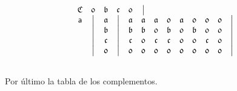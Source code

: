 \documentclass[final,12pt,a4paper,twoside,fleqn]{extbook}
\theoremstyle{definition}
\theoremstyle{remark}
\begin{document}
\begin{equation}
\begin{array}{@{}*{22}c@{}}
      {\mathfrak{C}} &%
      {\mathfrak{0}} &%
      {\mathfrak{b}} &%
      {\mathfrak{c}} &%
      {\mathfrak{0}} &%
      \big\vert       %
      \\ \nonumber
      {\textsf{a}}   &%
      \big\vert      &%
      {\mathfrak{a}} &%
      \big\vert      &%
      {\mathfrak{a}} &%
      {\mathfrak{a}} &%
      {\mathfrak{a}} &%
      {\mathfrak{0}} &%
      {\mathfrak{a}} &%
      {\mathfrak{0}} &%
      {\mathfrak{0}} &%
      {\mathfrak{0}} &%
      \big\vert       %
      \\ \nonumber
      {}             &%
      \big\vert      &%
      {\mathfrak{b}} &%
      \big\vert      &%
      {\mathfrak{b}} &%
      {\mathfrak{b}} &%
      {\mathfrak{0}} &%
      {\mathfrak{b}} &%
      {\mathfrak{0}} &%
      {\mathfrak{b}} &%
      {\mathfrak{0}} &%
      {\mathfrak{0}} &%
      \big\vert       %
      \\ \nonumber
      {}             &%
      \big\vert      &%
      {\mathfrak{c}} &%
      \big\vert      &%
      {\mathfrak{c}} &%
      {\mathfrak{0}} &%
      {\mathfrak{c}} &%
      {\mathfrak{c}} &%
      {\mathfrak{0}} &%
      {\mathfrak{0}} &%
      {\mathfrak{c}} &%
      {\mathfrak{0}} &%
      \big\vert       %
      \\ \nonumber
      {}             &%
      \big\vert      &%
      {\mathfrak{0}} &%
      \big\vert      &%
      {\mathfrak{0}} &%
      {\mathfrak{0}} &%
      {\mathfrak{0}} &%
      {\mathfrak{0}} &%
      {\mathfrak{0}} &%
      {\mathfrak{0}} &%
      {\mathfrak{0}} &%
      {\mathfrak{0}} &%
      \big\vert       %
      \\ \nonumber
    \end{array}
\end{equation}



	Por último la tabla de los complementos.
\end{document}

